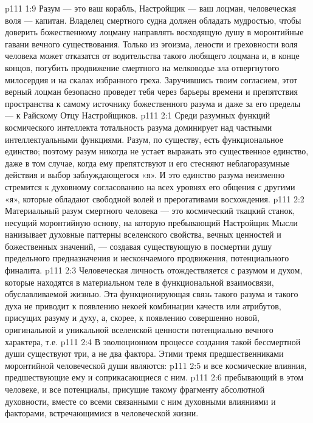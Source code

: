 \vs p111 1:9 \pc Разум --- это ваш корабль, Настройщик --- ваш лоцман, человеческая воля --- капитан. Владелец смертного судна должен обладать мудростью, чтобы доверить божественному лоцману направлять восходящую душу в моронтийные гавани вечного существования. Только из эгоизма, лености и греховности воля человека может отказатся от водительства такого любящего лоцмана и, в конце концов, погубить продвижение смертного на мелководье зла отвергнутого милосердия и на скалах избранного греха. Заручившись твоим согласием, этот верный лоцман безопасно проведет тебя через барьеры времени и препятствия пространства к самому источнику божественного разума и даже за его пределы --- к Райскому Отцу Настройщиков.
\vs p111 2:1 Среди разумных функций космического интеллекта тотальность разума доминирует над частными интеллектуальными функциями. Разум, по существу, есть функциональное единство; поэтому разум никогда не устает выражать это существенное единство, даже в том случае, когда ему препятствуют и его стесняют неблагоразумные действия и выбор заблуждающегося «я». И это единство разума неизменно стремится к духовному согласованию на всех уровнях его общения с другими «я», которые обладают свободной волей и прерогативами восхождения.
\vs p111 2:2 Материальный разум смертного человека --- это космический ткацкий станок, несущий моронтийную основу, на которую пребывающий Настройщик Мысли нанизывает духовные паттерны вселенского свойства, вечных ценностей и божественных значений, --- создавая существующую в посмертии душу предельного предназначения и нескончаемого продвижения, потенциального финалита.
\vs p111 2:3 Человеческая личность отождествляется с разумом и духом, которые находятся в материальном теле в функциональной взаимосвязи, обуславливаемой жизнью. Эта функционирующая связь такого разума и такого духа не приводит к появлению некоей комбинации качеств или атрибутов, присущих разуму и духу, а, скорее, к появлению совершенно новой, оригинальной и уникальной вселенской ценности потенциально вечного характера, т.е. 
\vs p111 2:4 \pc В эволюционном процессе создания такой бессмертной души существуют три, а не два фактора. Этими тремя предшественниками моронтийной человеческой души являются:
\vs p111 2:5 \bibnobreakspace {} и все космические влияния, предшествующие ему и соприкасающиеся с ним.
\vs p111 2:6 \pc {}\bibnobreakspace {} пребывающий в этом человеке, и все потенциалы, присущие такому фрагменту абсолютной духовности, вместе со всеми связанными с ним духовными влияниями и факторами, встречающимися в человеческой жизни.
